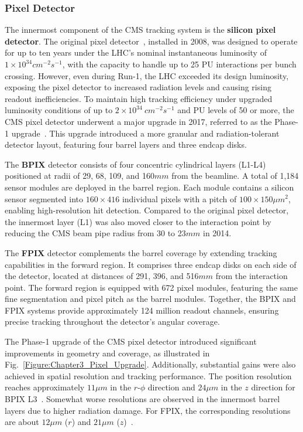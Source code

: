 \subsubsection{Pixel Detector}

The innermost component of the \ac{CMS} tracking system is the \textbf{silicon pixel detector}. The original pixel detector~\cite{LHC_CMS}, installed in 2008, was designed to operate for up to ten years under the \ac{LHC}’s nominal instantaneous luminosity of $1 \times 10^{34}\unit{cm}^{-2}\unit{s}^{-1}$, with the capacity to handle up to 25 \ac{PU} interactions per bunch crossing. However, even during Run-1, the \ac{LHC} exceeded its design luminosity, exposing the pixel detector to increased radiation levels and causing rising readout inefficiencies. To maintain high tracking efficiency under upgraded luminosity conditions of up to $2 \times 10^{34}~\unit{cm}^{-2}\unit{s}^{-1}$ and \ac{PU} levels of 50 or more, the \ac{CMS} pixel detector underwent a major upgrade in 2017, referred to as the Phase-1 upgrade~\cite{CMS_Detector_Run3, CMS_Tracker_Phase1_Upgrade,CMS_Tracker_Phase1_Upgrade_2}. This upgrade introduced a more granular and radiation-tolerant detector layout, featuring four barrel layers and three endcap disks.

The \textbf{\ac{BPIX}} detector consists of four concentric cylindrical layers (L1-L4) positioned at radii of 29, 68, 109, and 160$\unit{mm}$ from the beamline. A total of 1,184 sensor modules are deployed in the barrel region. Each module contains a silicon sensor segmented into $160 \times 416$ individual pixels with a pitch of $100 \times 150\unit{\mu m}^2$, enabling high-resolution hit detection. Compared to the original pixel detector, the innermost layer (L1) was also moved closer to the interaction point by reducing the \ac{CMS} beam pipe radius from 30 to 23$\unit{mm}$ in 2014. 

The \textbf{\ac{FPIX}} detector complements the barrel coverage by extending tracking capabilities in the forward region. It comprises three endcap disks on each side of the detector, located at distances of 291, 396, and 516$\unit{mm}$ from the interaction point. The forward region is equipped with 672 pixel modules, featuring the same fine segmentation and pixel pitch as the barrel modules. Together, the \ac{BPIX} and \ac{FPIX} systems provide approximately 124 million readout channels, ensuring precise tracking throughout the detector’s angular coverage.

The Phase-1 upgrade of the \ac{CMS} pixel detector introduced significant improvements in geometry and coverage, as illustrated in Fig.~\ref{Figure:Chapter3_Pixel_Upgrade}. Additionally, substantial gains were also achieved in spatial resolution and tracking performance. The position resolution reaches approximately $11\unit{\mu m}$ in the $r$-$\phi$ direction and $24\unit{\mu m}$ in the $z$ direction for \ac{BPIX} L3~\cite{CMS_Detector_Run3}. Somewhat worse resolutions are observed in the innermost barrel layers due to higher radiation damage. For \ac{FPIX}, the corresponding resolutions are about $12\unit{\mu m}$ ($r$) and $21\unit{\mu m}$ ($z$)~\cite{CMS_Detector_Run3}. 

